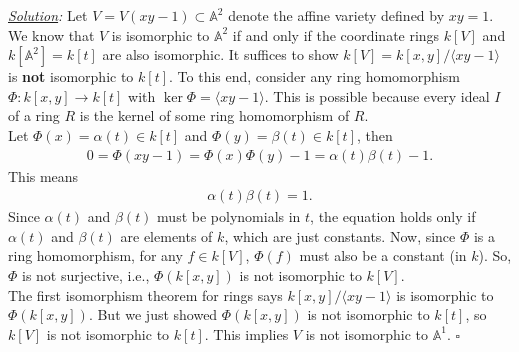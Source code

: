 \documentclass[12pt]{article}
\newcommand{\A}{\mathbb{A}}
\begin{document}
\noindent \textit{\underline{Solution}:} Let $V=V(xy-1)\subset \A^2$ denote the affine variety defined by $xy=1$. We know that $V$ is isomorphic to $\A^2$ if and only if the coordinate rings $k[V]$ and $k[\A^2] = k[t]$ are also isomorphic. It suffices to show $k[V] = k[x,y]/\langle xy-1\rangle$ is \textbf{not} isomorphic to $k[t]$. To this end, consider any ring homomorphism $\Phi: k[x,y] \to k[t]$ with $\ker\Phi = \langle xy-1\rangle$. This is possible because every ideal $I$ of a ring $R$ is the kernel of some ring homomorphism of $R$.\\

Let $\Phi(x) = \alpha(t) \in k[t]$ and $\Phi(y) = \beta(t)\in k[t]$, then 
\begin{align*}
0 = \Phi(xy-1) = \Phi(x)\Phi(y)-1 = \alpha(t)\beta(t) - 1. 
\end{align*}
This means 
\begin{align*}
\alpha(t)\beta(t) = 1.
\end{align*}
Since $\alpha(t)$ and $\beta(t)$ must be polynomials in $t$, the equation holds only if $\alpha(t)$ and $\beta(t)$ are elements of $k$, which are just constants. Now, since $\Phi$ is a ring homomorphism, for any $f\in k[V]$, $\Phi(f)$ must also be a constant (in $k$). So, $\Phi$ is not surjective, i.e., $\Phi(k[x,y])$ is not isomorphic to $k[V]$. \\

The first isomorphism theorem for rings says $k[x,y]/\langle xy-1\rangle$ is isomorphic to $\Phi(k[x,y])$. But we just showed $\Phi(k[x,y])$ is not isomorphic to $k[t]$, so $k[V]$ is not isomorphic to $k[t]$. This implies $V$ is not isomorphic to $\A^1$.   \hfill$\square$


\newpage



















%
%
\end{document}

